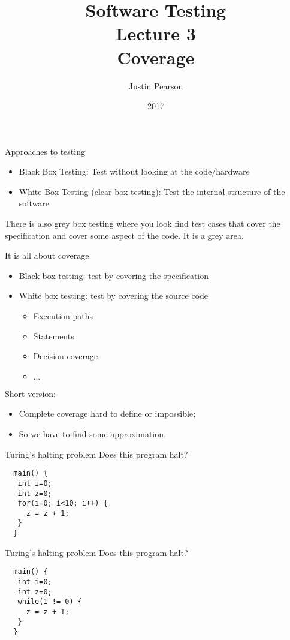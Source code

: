 \documentclass[handout]{beamer}
\title{Software Testing\\ Lecture 3\\ Coverage}
\author{Justin Pearson}
\date{2017}
\begin{document}
\lstset{language=C}

\begin{frame}
  \maketitle
\end{frame}

\begin{frame}{Approaches to testing}
  \begin{itemize}
  \item Black Box Testing: Test without looking at the code/hardware
  \item White Box Testing (clear box testing):  Test the internal
    structure of the software
  \end{itemize}
  There is also grey box testing where you look find test cases that cover the
  specification and cover some aspect of the code.  It is a grey area.  
\end{frame}
\begin{frame}{It is all about coverage}
  \begin{itemize}
  \item Black box testing: test by covering the specification
  \item White box testing: test by covering the source code
    \begin{itemize}
    \item Execution paths
    \item Statements
    \item Decision coverage
    \item $\ldots$
    \end{itemize}
  \end{itemize}
  Short version:
  \begin{itemize}
  \item  Complete coverage hard to define or impossible;
  \item  So we have to find some approximation.
  \end{itemize}
\end{frame}

\begin{frame}[fragile]{Turing's halting problem}
Does this program halt?
\begin{lstlisting}
  main() {
   int i=0;
   int z=0;
   for(i=0; i<10; i++) {
     z = z + 1;
   }
  }
\end{lstlisting}
\end{frame}
\begin{frame}[fragile]{Turing's halting problem}
Does this program halt?
\begin{lstlisting}
  main() {
   int i=0;
   int z=0;
   while(1 != 0) {
     z = z + 1;
   }
  }
\end{lstlisting}
\end{frame}
\end{document}
